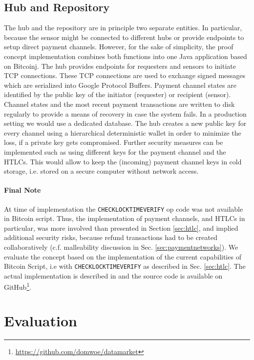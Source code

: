 \subsection{Hub and Repository}
The hub and the repository are in principle two separate entities. In particular, because the sensor might be connected to different hubs or provide endpoints to setup direct payment channels. However, for the sake of simplicity, the proof concept implementation combines both functions into one Java application based on Bitcoinj. The hub provides endpoints for requesters and sensors to initiate \ac{TCP} connections. These \ac{TCP} connections are used to exchange signed messages which are serialized into Google Protocol Buffers. Payment channel states are identified by the public key of the initiator (requester) or recipient (sensor). Channel states and the most recent payment transactions are written to disk regularly to provide a means of recovery in case the system fails. In a production setting we would use a dedicated database. 
The hub creates a new public key for every channel using a hierarchical deterministic wallet \parencite{bip32} in order to minimize the loss, if a private key gets compromised. Further security measures can be implemented such as using different keys for the payment channel and the \ac{HTLC}s. This would allow to keep the (incoming) payment channel keys in cold storage, i.e. stored on a secure computer without network access.
 
\paragraph{Final Note} At time of implementation the \texttt{CHECKLOCKTIMEVERIFY} op code \parencite{bip65} was not available in Bitcoin script. Thus, the implementation of payment channels, and \ac{HTLC}s in particular, was more involved than presented in Section \ref{sec:htlc}, and implied additional security risks, because refund transactions had to be created collaboratively (c.f. malleability discussion in Sec. \ref{sec:paymentnetworks}). 
 We evaluate the concept based on the implementation of the current capabilities of Bitcoin Script, i.e with \texttt{CHECKLOCKTIMEVERIFY} as described in Sec. \ref{sec:htlc}. The actual implementation is described in \parencite{bungiu} and the source code is available on GitHub\footnote{\url{https://github.com/domwoe/datamarket}}.

\section{Evaluation}
\label{sec:trust-lessevaluation}

